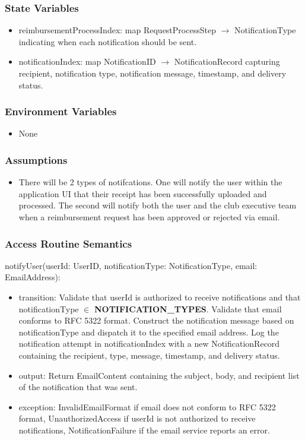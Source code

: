 \documentclass[12pt, titlepage]{article}
\begin{document}
\subsubsection{State Variables}

\begin{itemize}
  \item reimbursementProcessIndex: map RequestProcessStep $\rightarrow$ NotificationType indicating when each notification should be sent.
  \item notificationIndex: map NotificationID $\rightarrow$ NotificationRecord capturing recipient, notification type, notification message, timestamp, and delivery status.
\end{itemize}

\subsubsection{Environment Variables}

\begin{itemize}
  \item None
\end{itemize}

\subsubsection{Assumptions}

\begin{itemize}
  \item There will be 2 types of notifcations. One will notify the user within the application UI that their receipt has been successfully uploaded and processed. The second will notify both the user and the club executive team when a reimbursement request has been approved or rejected via email.
\end{itemize}

\subsubsection{Access Routine Semantics}

\noindent notifyUser(userId: UserID, notificationType: NotificationType, email: EmailAddress):
\begin{itemize}
  \item transition: Validate that userId is authorized to receive notifications and that notificationType $\in$ \textbf{NOTIFICATION\_TYPES}. Validate that email conforms to RFC 5322 format. Construct the notification message based on notificationType and dispatch it to the specified email address. Log the notification attempt in notificationIndex with a new NotificationRecord containing the recipient, type, message, timestamp, and delivery status.
  \item output: Return EmailContent containing the subject, body, and recipient list of the notification that was sent.
  \item exception: InvalidEmailFormat if email does not conform to RFC 5322 format, UnauthorizedAccess if userId is not authorized to receive notifications, NotificationFailure if the email service reports an error.
\end{itemize}
\end{document}
